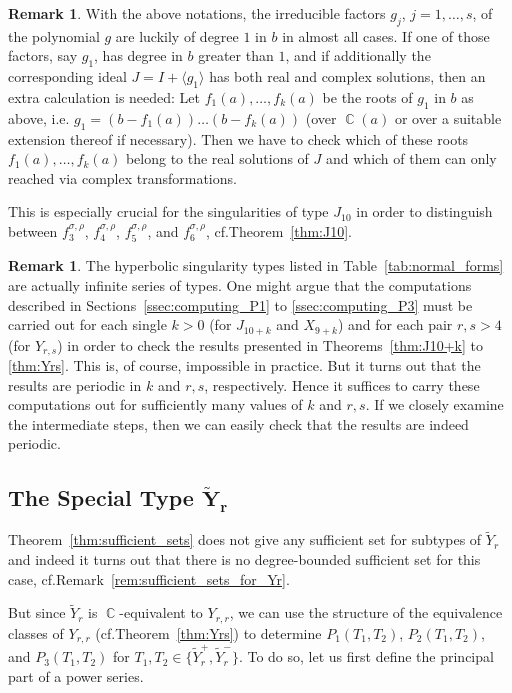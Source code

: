 \documentclass{amsproc}
\theoremstyle{definition}
\newtheorem{remark}[theorem]{Remark}
\newcommand{\tY}{\widetilde{Y}}
\DeclareMathOperator{\C}{\mathbb{C}}
\begin{document}
\begin{remark}
With the above notations, the irreducible factors $g_j$, $j = 1, \ldots, s$, of
the polynomial $g$ are luckily of degree $1$ in $b$ in almost all cases. If one
of those factors, say $g_1$, has degree in $b$ greater than $1$, and if
additionally the corresponding ideal $J = I + \langle g_1 \rangle$ has both
real and complex solutions, then an extra calculation is needed: Let
$f_1(a), \ldots, f_k(a)$ be the roots of $g_1$ in $b$ as above, i.e.\@
$g_1 = (b-f_1(a)) \ldots (b-f_k(a))$ (over $\C(a)$ or over a suitable extension
thereof if necessary). Then we have to check which of these roots
$f_1(a), \ldots, f_k(a)$ belong to the real solutions of $J$ and which of them
can only reached via complex transformations.

This is especially crucial for the singularities of type $J_{10}$ in order to
distinguish between $f_3^{\sigma,\rho}$, $f_4^{\sigma,\rho}$,
$f_5^{\sigma,\rho}$, and $f_6^{\sigma,\rho}$, cf.\@ Theorem~\ref{thm:J10}.
\end{remark}

\begin{remark}
The hyperbolic singularity types listed in Table~\ref{tab:normal_forms} are
actually infinite series of types. One might argue that the computations
described in Sections~\ref{ssec:computing_P1} to \ref{ssec:computing_P3} must
be carried out for each single $k > 0$ (for $J_{10+k}$ and $X_{9+k}$) and for
each pair $r,s > 4$ (for $Y_{r,s}$) in order to check the results presented in
Theorems~\ref{thm:J10+k} to \ref{thm:Yrs}. This is, of course, impossible in
practice. But it turns out that the results are periodic in $k$ and $r,s$,
respectively. Hence it suffices to carry these computations out for
sufficiently many values of $k$ and $r,s$. If we closely examine the
intermediate steps, then we can easily check that the results are indeed
periodic.
\end{remark}


\subsection{The Special Type $\boldsymbol{\tY_r}$}\label{ssec:Yr}

Theorem~\ref{thm:sufficient_sets} does not give any sufficient set for subtypes
of $\tY_r$ and indeed it turns out that there is no degree-bounded sufficient
set for this case, cf.\@ Remark~\ref{rem:sufficient_sets_for_Yr}.

But since $\tY_r$ is $\C$-equivalent to $Y_{r,r}$, we can use the structure of
the equivalence classes of $Y_{r,r}$ (cf.\@ Theorem~\ref{thm:Yrs}) to determine
$P_1(T_1, T_2)$, $P_2(T_1, T_2)$, and $P_3(T_1, T_2)$ for
$T_1, T_2 \in \bigl\{\tY_r^+, \tY_r^-\bigr\}$. To do so, let us first define
the principal part of a power series.
\end{document}
